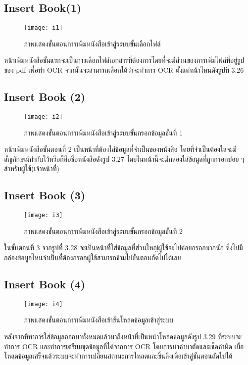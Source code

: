 \subsection{Insert Book(1)}
\begin{figure}[H]
    \centering
    \texttt{[image: i1]}
    \caption{ภาพแสดงขั้นตอนการเพิ่มหนังสือเข้าสู่ระบบขั้นเลือกไฟล์}\label{fig:i1}
\end{figure}
หน้าเพิ่มหนังสือขั้นแรกจะเป็นการเลือกไฟล์เอกสารที่ต้องการโดยที่จะมีส่วนของการเพิ่มไฟล์ที่อยู่รูปของ pdf เพื่อทำ OCR จากนั้นจะสามารถเลือกได้ว่าจะทำการ OCR ตั้งแต่หน้าไหนดังรูปที่ 3.26

\subsection{Insert Book (2) }
\begin{figure}[H]
    \centering
    \texttt{[image: i2]}
    \caption{ภาพแสดงขั้นตอนการเพิ่มหนังสือเข้าสู่ระบบขั้นกรอกข้อมูลขั้นที่ 1}\label{fig:i2}
\end{figure}
หน้าเพิ่มหนังสือขั้นตอนที่ 2 เป็นหน้าที่ต้องใส่ข้อมูลที่จำเป็นของหนังสือ โดยที่จำเป็นต้องใส่จะมีสัญลักษณ์กำกับไว้หรือก็คือชื่อหนังสือดังรูป 3.27 โดยในหน้านี้จะมีกล่องใส่ข้อมูลที่ถูกกรอกบ่อย ๆสำหรับผู้ใช้(เจ้าหน้าที่)

\subsection{Insert Book (3)}
\begin{figure}[H]
    \centering
    \texttt{[image: i3]}
    \caption{ภาพแสดงขั้นตอนการเพิ่มหนังสือเข้าสู่ระบบขั้นกรอกข้อมูลขั้นที่ 2}\label{fig:i3}
\end{figure}
ในขั้นตอนที่ 3 จากรูปที่ 3.28 จะเป็นหน้าที่ใส่ข้อมูลที่ส่วนใหญ่ผู้ใช้จะไม่ค่อยกรอกมากนัก ซึ่งไม่มีกล่องข้อมูลไหนจำเป็นที่ต้องกรอกผู้ใช้สามารถข้ามไปขั้นตอนถัดไปได้เลย

\subsection{Insert Book (4)}
\begin{figure}[H]
    \centering
    \texttt{[image: i4]}
    \caption{ภาพแสดงขั้นตอนการเพิ่มหนังสือเข้าขั้นโหลดข้อมูลเข้าสู่ระบบ}\label{fig:i4}
\end{figure}
หลังจากที่ทำการใส่ข้อมูลออกมาทั้งหมดแล้วมาถึงหน้าที่เป็นหน้าโหลดข้อมูลดังรูป 3.29 ที่ระบบจะทำการ OCR และทำการเตรียมชุดข้อมูลที่ได้จากการ OCR โดยการนำคำมาตัดและเช็คคำผิด เมื่อโหลดข้อมูลเสร็จแล้วระบบจะทำการเปลี่ยนสถานะการโหลดและขึ้นลิ้งเพื่อเข้าสู่ขั้นตอนถัดไปได้

